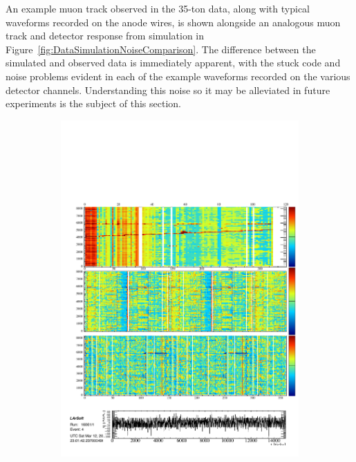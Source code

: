 An example muon track observed in the 35-ton data, along with typical waveforms recorded on the anode wires, is shown alongside an analogous muon track and detector response from simulation in Figure~\ref{fig:DataSimulationNoiseComparison}.  The difference between the simulated and observed data is immediately apparent, with the stuck code and noise problems evident in each of the example waveforms recorded on the various detector channels.  Understanding this noise so it may be alleviated in future experiments is the subject of this section.

\begin{figure}
  \centering

  \begin{subfigure}[t]{\linewidth}
    \centering
    \begin{minipage}{0.48\textwidth}
      \centering
      \includegraphics[width=\textwidth]{DataMuon.pdf}

\end{minipage}
\end{subfigure}
\end{figure}
